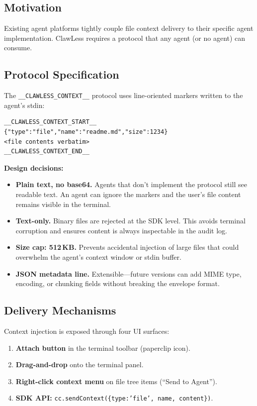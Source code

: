 \documentclass[11pt,twocolumn]{article}
\begin{document}
\subsection{Motivation}

Existing agent platforms tightly couple file context delivery to their specific agent implementation. ClawLess requires a protocol that any agent (or no agent) can consume.

\subsection{Protocol Specification}

The \texttt{\_\_CLAWLESS\_CONTEXT\_\_} protocol uses line-oriented markers written to the agent's stdin:

\begin{lstlisting}
__CLAWLESS_CONTEXT_START__
{"type":"file","name":"readme.md","size":1234}
<file contents verbatim>
__CLAWLESS_CONTEXT_END__
\end{lstlisting}

\textbf{Design decisions:}

\begin{itemize}[noitemsep]
  \item \textbf{Plain text, no base64.} Agents that don't implement the protocol still see readable text. An agent can ignore the markers and the user's file content remains visible in the terminal.
  \item \textbf{Text-only.} Binary files are rejected at the SDK level. This avoids terminal corruption and ensures content is always inspectable in the audit log.
  \item \textbf{Size cap: 512\,KB.} Prevents accidental injection of large files that could overwhelm the agent's context window or stdin buffer.
  \item \textbf{JSON metadata line.} Extensible---future versions can add MIME type, encoding, or chunking fields without breaking the envelope format.
\end{itemize}

\subsection{Delivery Mechanisms}

Context injection is exposed through four UI surfaces:

\begin{enumerate}[noitemsep]
  \item \textbf{Attach button} in the terminal toolbar (paperclip icon).
  \item \textbf{Drag-and-drop} onto the terminal panel.
  \item \textbf{Right-click context menu} on file tree items (``Send to Agent'').
  \item \textbf{SDK API:} \texttt{cc.sendContext(\{type:'file', name, content\})}.
\end{enumerate}
\end{document}
